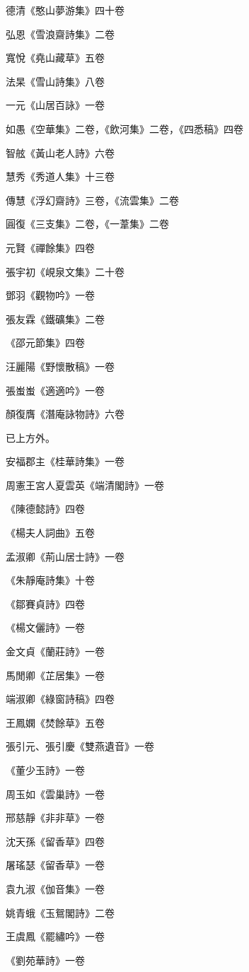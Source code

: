 德清《憨山夢游集》四十卷

弘恩《雪浪齋詩集》二卷

寬悅《堯山藏草》五卷

法杲《雪山詩集》八卷

一元《山居百詠》一卷

如愚《空華集》二卷，《飲河集》二卷，《四悉稿》四卷

智舷《黃山老人詩》六卷

慧秀《秀道人集》十三卷

傳慧《浮幻齋詩》三卷，《流雲集》二卷

圓復《三支集》二卷，《一葦集》二卷

元賢《禪餘集》四卷

張宇初《峴泉文集》二十卷

鄧羽《觀物吟》一卷

張友霖《鐵礦集》二卷

《邵元節集》四卷

汪麗陽《野懷散稿》一卷

張蚩蚩《適適吟》一卷

顏復膺《潛庵詠物詩》六卷

已上方外。

安福郡主《桂華詩集》一卷

周憲王宮人夏雲英《端清閣詩》一卷

《陳德懿詩》四卷

《楊夫人詞曲》五卷

孟淑卿《荊山居士詩》一卷

《朱靜庵詩集》十卷

《鄒賽貞詩》四卷

《楊文儷詩》一卷

金文貞《蘭莊詩》一卷

馬閒卿《芷居集》一卷

端淑卿《綠窗詩稿》四卷

王鳳嫻《焚餘草》五卷

張引元、張引慶《雙燕遺音》一卷

《董少玉詩》一卷

周玉如《雲巢詩》一卷

邢慈靜《非非草》一卷

沈天孫《留香草》四卷

屠瑤瑟《留香草》一卷

袁九淑《伽音集》一卷

姚青蛾《玉鴛閣詩》二卷

王虞鳳《罷繡吟》一卷

《劉苑華詩》一卷

